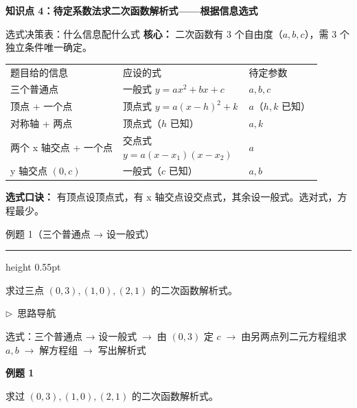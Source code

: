 \documentclass{exam-zh}
\newcommand{\edukai}{\kaishu}
\newcommand{\eduSectionTitle}[1]{%
  \needspace{5\baselineskip}%
  \vspace{2mm}
  {\color{edu-blue}\bfseries\large #1}\par
  \vspace{3mm}
}
\newenvironment{eduSubQuestionItem}[1]{%
  \needspace{4\baselineskip}%
  \vspace{2mm}
  \par\noindent
  \hangindent=8mm\hangafter=1
  {\color{edu-blue}\bfseries #1}\enspace
  \begingroup
  \color{edu-ink}
}{%
  \endgroup
  \par
  \vspace{3mm}
}
\newenvironment{eduAuxItem}[1]{%
  \needspace{4\baselineskip}%
  \vspace{2mm}
  \par\noindent
  \hangindent=8mm\hangafter=1
  {\color{edu-blue}\edukai $\triangleright$~#1}\enspace
  \begingroup
  \color{edu-ink}
  \edukai
}{%
  \endgroup
  \par
  \vspace{4mm}
}
\newenvironment{eduProblemBlock}[1][题目]{%
  \needspace{8\baselineskip}
  {\small\color{edu-muted}#1}\par
  \vspace{1.5mm}
  {\color{edu-blue}\hrule height 0.55pt}
  \vspace{4.5mm}
  \begingroup
  \color{edu-ink}
  \large
  \setlength{\parskip}{2.2mm}
  \linespread{1.20}\selectfont
}{%
  \par
  \endgroup
  \vspace{6mm}
}
\begin{document}
\eduSectionTitle{知识点 4：待定系数法求二次函数解析式——根据信息选式}


\begin{eduSolutionBox}{选式决策表：什么信息配什么式}
  \begingroup
  \setlength{\parskip}{2.5mm}
\textbf{核心：} 二次函数有 3 个自由度（$a,b,c$），需 3 个独立条件唯一确定。\par
\begin{tabular}{p{0.34\linewidth}p{0.34\linewidth}p{0.22\linewidth}}
题目给的信息 & 应设的式 & 待定参数\\
三个普通点 & 一般式 $y=ax^2+bx+c$ & $a,b,c$\\
顶点 + 一个点 & 顶点式 $y=a(x-h)^2+k$ & $a$（$h,k$ 已知）\\
对称轴 + 两点 & 顶点式（$h$ 已知）& $a,k$\\
两个 x 轴交点 + 一个点 & 交点式 $y=a(x-x_1)(x-x_2)$ & $a$\\
y 轴交点 $(0,c)$ & 一般式（$c$ 已知）& $a,b$\\
\end{tabular}
\par
\textbf{选式口诀：} 有顶点设顶点式，有 x 轴交点设交点式，其余设一般式。选对式，方程最少。\par
  \endgroup
\end{eduSolutionBox}




\begin{eduProblemBlock}[例题 1（三个普通点 → 设一般式）]
求过三点 $(0,3),(1,0),(2,1)$ 的二次函数解析式。

\end{eduProblemBlock}





\begin{eduAuxItem}{思路导航}
选式：三个普通点 → 设一般式$\;\to\;$由 $(0,3)$ 定 $c$$\;\to\;$由另两点列二元方程组求 $a,b$$\;\to\;$解方程组$\;\to\;$写出解析式\end{eduAuxItem}




\begin{eduSubQuestionItem}{例题 1}
求过 $(0,3),(1,0),(2,1)$ 的二次函数解析式。\end{eduSubQuestionItem}
\end{document}
